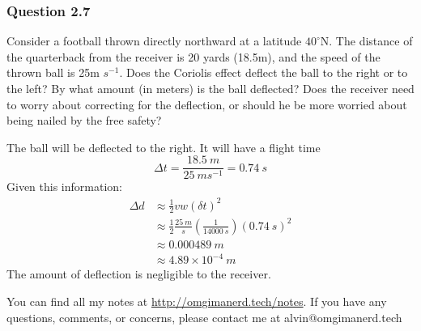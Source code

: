 \documentclass{math}
\begin{document}
\subsubsection*{Question 2.7}
Consider a football thrown directly northward at a latitude \( 40^{\circ} \)N.
The distance of the quarterback from the receiver is 20 yards (18.5m), and the
speed of the thrown ball is 25m \( s^{-1} \). Does the Coriolis effect deflect
the ball to the right or to the left? By what amount (in meters) is the ball
deflected? Does the receiver need to worry about correcting for the deflection,
or should he be more worried about being nailed by the free safety? \par
The ball will be deflected to the right. It will have a flight time
\[ \Delta t = \frac{18.5~m}{25~ms^{-1}} = 0.74~s \]
Given this information:
\begin{align*}
  \Delta d &\approx \frac{1}{2}vw(\delta t)^2 \\
  &\approx \frac{1}{2}\frac{25~m}{s}(\frac{1}{14000~s})(0.74~s)^2 \\
  &\approx 0.000489~m \\
  &\approx 4.89\times10^{-4}~m
\end{align*}
The amount of deflection is negligible to the receiver.

\begin{center}
  You can find all my notes at \url{http://omgimanerd.tech/notes}. If you have
  any questions, comments, or concerns, please contact me at
  alvin@omgimanerd.tech
\end{center}
\end{document}
